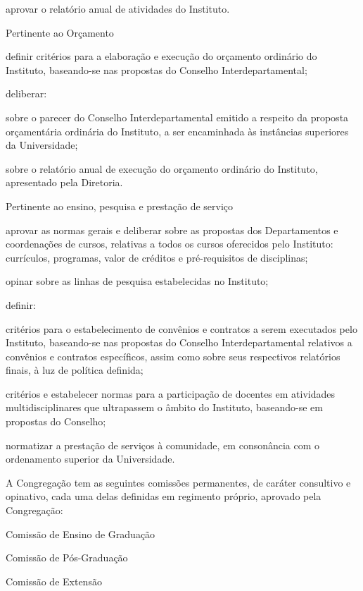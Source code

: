 \documentclass{documento}
\begin{document}
\subinciso aprovar o relatório anual de atividades do Instituto.

\inciso Pertinente ao Orçamento

\subinciso definir critérios para a elaboração e execução do orçamento ordinário do Instituto, baseando-se nas propostas do Conselho Interdepartamental;

\subinciso deliberar:

\subsubinciso sobre o parecer do Conselho Interdepartamental emitido a respeito da proposta orçamentária ordinária do Instituto, a ser encaminhada às instâncias superiores da Universidade;

\subsubinciso sobre o relatório anual de execução do orçamento ordinário do Instituto, apresentado pela Diretoria.

\inciso Pertinente ao ensino, pesquisa e prestação de serviço

\subinciso aprovar as normas gerais e deliberar sobre as propostas dos Departamentos e coordenações de cursos, relativas a todos os cursos oferecidos pelo Instituto: currículos, programas, valor de créditos e pré-requisitos de disciplinas;

\subinciso opinar sobre as linhas de pesquisa estabelecidas no Instituto;

\subinciso definir: 

\subsubinciso critérios para o estabelecimento de convênios e contratos a serem executados pelo Instituto, baseando-se nas propostas do Conselho Interdepartamental relativos a convênios e contratos específicos, assim como sobre seus respectivos relatórios finais, à luz de política definida;

\subsubinciso critérios e estabelecer normas para a participação de docentes em atividades multidisciplinares que ultrapassem o âmbito do Instituto, baseando-se em propostas do Conselho;

\subinciso normatizar a prestação de serviços à comunidade, em consonância com o ordenamento superior da Universidade. 


\artigo A Congregação tem as seguintes comissões permanentes, de caráter consultivo e opinativo, cada uma delas definidas em regimento próprio, aprovado pela Congregação:

\inciso Comissão de Ensino de Graduação

\inciso Comissão de Pós-Graduação

\inciso Comissão de Extensão
\end{document}
